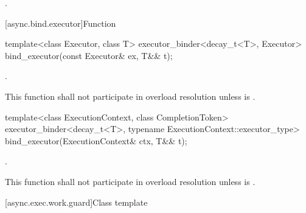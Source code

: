 \begin{itemdescr}
\pnum
\returns {}.
\end{itemdescr}




[async.bind.executor]{Function }

%
\begin{itemdecl}
template<class Executor, class T>
  executor_binder<decay_t<T>, Executor>
    bind_executor(const Executor& ex, T&& t);
\end{itemdecl}

\begin{itemdescr}
\pnum
\returns {}.

\pnum
\remarks This function shall not participate in overload resolution unless
 is .
\end{itemdescr}

%
\begin{itemdecl}
template<class ExecutionContext, class CompletionToken>
  executor_binder<decay_t<T>, typename ExecutionContext::executor_type>
    bind_executor(ExecutionContext& ctx, T&& t);
\end{itemdecl}

\begin{itemdescr}
\pnum
\returns {}.

\pnum
\remarks This function shall not participate in overload resolution unless
 is .
\end{itemdescr}



[async.exec.work.guard]{Class template }

